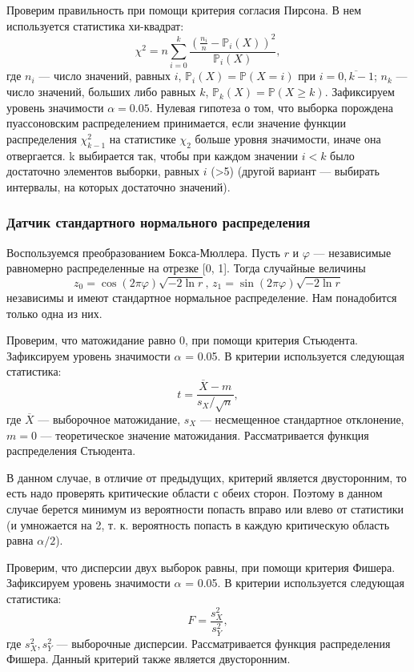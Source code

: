 \documentclass{article}
\renewcommand{\ge}{\geqslant}
\theoremstyle{definition}
\begin{document}
Проверим правильность при помощи критерия согласия Пирсона. В нем используется статистика хи-квадрат:
$$\chi^2 = n \sum_{i = 0}^k \frac{(\frac{n_i}{n} - \mathbb{P}_i(X))^2}{\mathbb{P}_i(X)},$$
где $n_i$ --- число значений, равных $i$, $\mathbb{P}_i(X) = \mathbb{P}(X = i)$ при $i = \overline{0,k-1}$; $n_k$ --- число значений, больших либо равных $k$, $\mathbb{P}_k(X) = \mathbb{P}(X \ge k)$. Зафиксируем уровень значимости $\alpha = 0.05$. Нулевая гипотеза о том, что выборка порождена пуассоновским распределением принимается, если значение функции распределения $\chi^2_{k-1}$ на статистике $\chi_2$ больше уровня значимости, иначе она отвергается. k выбирается так, чтобы при каждом значении $i < k$ было достаточно элементов выборки, равных $i$ (>5) (другой вариант --- выбирать интервалы, на которых достаточно значений).

\subsubsection{Датчик стандартного нормального распределения}

Воспользуемся преобразованием Бокса-Мюллера. Пусть $r$ и $\varphi$ --- независимые равномерно распределенные на отрезке [0, 1]. Тогда случайные величины
$$z_0 = \cos(2\pi \varphi)\sqrt{-2\ln r},\, z_1 = \sin(2\pi \varphi)\sqrt{-2\ln r}$$
независимы и имеют стандартное нормальное распределение. Нам понадобится только одна из них.

Проверим, что матожидание равно 0, при помощи критерия Стьюдента. Зафиксируем уровень значимости \(\alpha\) = 0.05. В критерии используется следующая статистика:
$$t = \frac{\overline X - m}{s_X/\sqrt n},$$
где $\overline X$ --- выборочное матожидание, $s_X$ --- несмещенное стандартное отклонение, $m = 0$ --- теоретическое значение матожидания. Рассматривается функция распределения Стьюдента.

В данном случае, в отличие от предыдущих, критерий является двусторонним, то есть надо проверять критические области с обеих сторон. Поэтому в данном случае берется минимум из вероятности попасть вправо или влево от статистики (и умножается на 2, т. к. вероятность попасть в каждую критическую область равна $\alpha/2$).

Проверим, что дисперсии двух выборок равны, при помощи критерия Фишера. Зафиксируем уровень значимости \(\alpha\) = 0.05. В критерии используется следующая статистика:
$$F = \frac{s^2_X}{s^2_Y},$$
где $s^2_X, s^2_Y$ --- выборочные дисперсии. Рассматривается функция распределения Фишера. Данный критерий также является двусторонним.
\end{document}
